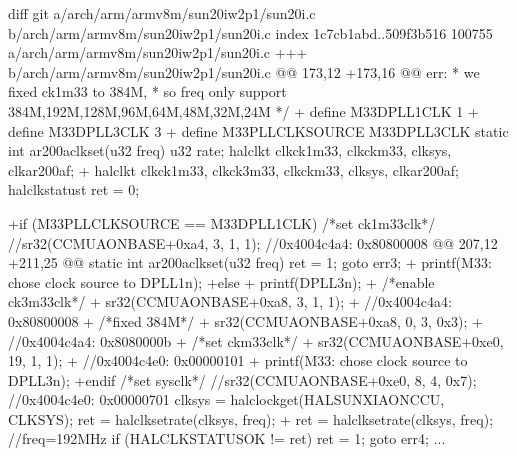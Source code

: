 \documentclass[letterpaper,10pt,english]{sphinxmanual}
\begin{document}
\begin{sphinxVerbatim}[commandchars=\\\{\}]
diff \PYGZhy{}\PYGZhy{}git a/arch/arm/armv8m/sun20iw2p1/sun20i.c b/arch/arm/armv8m/sun20iw2p1/sun20i.c
index 1c7cb1abd..509f3b516 100755
\PYGZhy{}\PYGZhy{}\PYGZhy{} a/arch/arm/armv8m/sun20iw2p1/sun20i.c
+++ b/arch/arm/armv8m/sun20iw2p1/sun20i.c
@@ \PYGZhy{}173,12 +173,16 @@ err:
  * we fixed ck1\PYGZus{}m33 to 384M,
  * so freq only support 384M,192M,128M,96M,64M,48M,32M,24M
  */
+ \PYGZsh{}define M33\PYGZus{}DPLL1\PYGZus{}CLK 1
+ \PYGZsh{}define M33\PYGZus{}DPLL3\PYGZus{}CLK 3
+ \PYGZsh{}define M33\PYGZus{}PLL\PYGZus{}CLK\PYGZus{}SOURCE M33\PYGZus{}DPLL3\PYGZus{}CLK
 static int ar200a\PYGZus{}clk\PYGZus{}set(u32 freq)
 \PYGZob{}
        u32 rate;
\PYGZhy{}       hal\PYGZus{}clk\PYGZus{}t clk\PYGZus{}ck1\PYGZus{}m33, clk\PYGZus{}ck\PYGZus{}m33, clk\PYGZus{}sys, clk\PYGZus{}ar200a\PYGZus{}f;
+       hal\PYGZus{}clk\PYGZus{}t clk\PYGZus{}ck1\PYGZus{}m33, clk\PYGZus{}ck3\PYGZus{}m33, clk\PYGZus{}ck\PYGZus{}m33, clk\PYGZus{}sys, clk\PYGZus{}ar200a\PYGZus{}f;
        hal\PYGZus{}clk\PYGZus{}status\PYGZus{}t ret = 0;

+\PYGZsh{}if (M33\PYGZus{}PLL\PYGZus{}CLK\PYGZus{}SOURCE == M33\PYGZus{}DPLL1\PYGZus{}CLK)
        /*set ck1\PYGZus{}m33\PYGZus{}clk*/
        //sr32(CCMU\PYGZus{}AON\PYGZus{}BASE+0xa4,  3, 1, 1);
        //0x4004c4a4: 0x80800008
@@ \PYGZhy{}207,12 +211,25 @@ static int ar200a\PYGZus{}clk\PYGZus{}set(u32 freq)
                ret = \PYGZhy{}1;
                goto err3;
        \PYGZcb{}
\PYGZhy{}
+       printf(\PYGZdq{}M33: chose clock source to DPLL1\PYGZbs{}n\PYGZdq{});
+\PYGZsh{}else
+       printf(\PYGZdq{}DPLL3\PYGZbs{}n\PYGZdq{});
+       /*enable ck3\PYGZus{}m33\PYGZus{}clk*/
+       sr32(CCMU\PYGZus{}AON\PYGZus{}BASE+0xa8,  3, 1, 1);
+       //0x4004c4a4: 0x80800008
+       /*fixed 384M*/
+       sr32(CCMU\PYGZus{}AON\PYGZus{}BASE+0xa8,  0, 3, 0x3);
+       //0x4004c4a4: 0x8080000b
+       /*set ck\PYGZus{}m33\PYGZus{}clk*/
+       sr32(CCMU\PYGZus{}AON\PYGZus{}BASE+0xe0, 19, 1, 1);
+       //0x4004c4e0: 0x00000101
+       printf(\PYGZdq{}M33: chose clock source to DPLL3\PYGZbs{}n\PYGZdq{});
+\PYGZsh{}endif
        /*set sys\PYGZus{}clk*/
        //sr32(CCMU\PYGZus{}AON\PYGZus{}BASE+0xe0,  8, 4, 0x7);
        //0x4004c4e0: 0x00000701
        clk\PYGZus{}sys = hal\PYGZus{}clock\PYGZus{}get(HAL\PYGZus{}SUNXI\PYGZus{}AON\PYGZus{}CCU, CLK\PYGZus{}SYS);
\PYGZhy{}       ret = hal\PYGZus{}clk\PYGZus{}set\PYGZus{}rate(clk\PYGZus{}sys, freq);
+       ret = hal\PYGZus{}clk\PYGZus{}set\PYGZus{}rate(clk\PYGZus{}sys, freq); //freq=192MHz
        if (HAL\PYGZus{}CLK\PYGZus{}STATUS\PYGZus{}OK != ret) \PYGZob{}
                ret = \PYGZhy{}1;
                goto err4;
...
\end{sphinxVerbatim}
\end{document}
